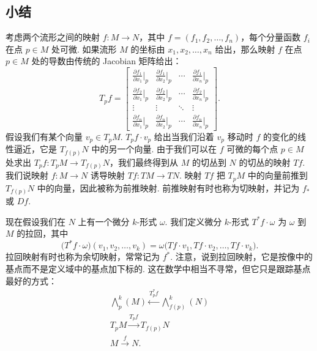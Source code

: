 \subsection{小结}

考虑两个流形之间的映射 $f:M\to N$，其中 $f=(f_1,f_2,\ldots,f_n)$，每个分量函数 $f_i$ 在点 $p\in M$ 处可微. 如果流形 $M$ 的坐标由 $x_1,x_2,\ldots,x_n$ 给出，那么映射 $f$ 在点 $p\in M$ 处的导数由传统的 Jacobian 矩阵给出：
\[
T_pf=
\begin{bmatrix}
\frac{\partial f_1}{\partial x_1}\Big|_p&\frac{\partial f_1}{\partial x_2}\Big|_p&\cdots&\frac{\partial f_1}{\partial x_n}\Big|_p\\
\frac{\partial f_2}{\partial x_1}\Big|_p&\frac{\partial f_2}{\partial x_2}\Big|_p&\cdots&\frac{\partial f_2}{\partial x_n}\Big|_p\\
\vdots&\vdots&\ddots&\vdots\\
\frac{\partial f_n}{\partial x_1}\Big|_p&\frac{\partial f_n}{\partial x_2}\Big|_p&\cdots&\frac{\partial f_n}{\partial x_n}\Big|_p
\end{bmatrix}.
\]
假设我们有某个向量 $v_p\in T_pM$. $T_pf\cdot v_p$ 给出当我们沿着 $v_p$ 移动时 $f$ 的变化的线性逼近，它是 $T_{f(p)}N$ 中的另一个向量. 由于我们可以在 $f$ 可微的每个点 $p\in M$ 处求出 $T_pf:T_pM\to T_{f(p)}N$，我们最终得到从 $M$ 的切丛到 $N$ 的切丛的映射 $Tf$. 我们说映射 $f:M\to N$ 诱导映射 $Tf:TM\to TN$. 映射 $Tf$ 把 $T_pM$ 中的向量前推到 $T_{f(p)}N$ 中的向量，因此被称为前推映射. 前推映射有时也称为切映射，并记为 $f_*$ 或 $Df$.

现在假设我们在 $N$ 上有一个微分 $k$-形式 $\omega$. 我们定义微分 $k$-形式 $T^*f\cdot\omega$ 为 $\omega$ 到 $M$ 的拉回，其中
\[
\bigl(T^*f\cdot\omega\bigr)(v_1,v_2,\ldots,v_k)=\omega\bigl(Tf\cdot v_1,Tf\cdot v_2,\ldots,Tf\cdot v_k\bigr).
\]
拉回映射有时也称为余切映射，常常记为 $f^*$. 注意，说到拉回映射，它是按像中的基点而不是定义域中的基点加下标的. 这在数学中相当不寻常，但它只是跟踪基点最好的方式：
\[
\begin{gathered}
\bigwedge_p^k(M)\xleftarrow{T_p^*f}\bigwedge_{f(p)}^k(N)\\
T_pM\xrightarrow{T_pf}T_{f(p)}N\\
M\xrightarrow{f}N.
\end{gathered}
\]

